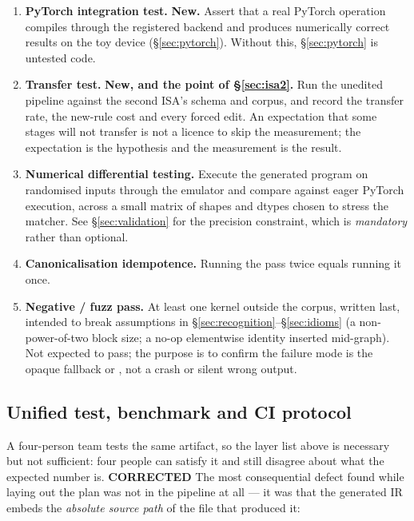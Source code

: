 \documentclass[11pt,a4paper]{article}
\newcommand{\falsified}{\textbf{\textcolor{red!75!black}{CORRECTED}}}
\begin{document}
\begin{enumerate}[leftmargin=1.5em,itemsep=0.35em]
\item \textbf{PyTorch integration test.} \textbf{New.} Assert that a real PyTorch operation compiles through
       the registered backend and produces numerically correct results on the toy device
       (\S\ref{sec:pytorch}). Without this, \S\ref{sec:pytorch} is untested code.

\item \textbf{Transfer test.} \textbf{New, and the point of \S\ref{sec:isa2}.} Run the unedited pipeline
       against the second ISA's schema and corpus, and record the transfer rate, the new-rule cost and every
       forced edit. An expectation that some stages will not transfer is not a licence to skip the
       measurement; the expectation is the hypothesis and the measurement is the result.

\item \textbf{Numerical differential testing.} Execute the generated program on randomised inputs through
       the emulator and compare against eager PyTorch execution, across a small matrix of shapes and dtypes
       chosen to stress the matcher. See \S\ref{sec:validation} for the precision constraint, which is
       \emph{mandatory} rather than optional.

\item \textbf{Canonicalisation idempotence.} Running the pass twice equals running it once.

\item \textbf{Negative / fuzz pass.} At least one kernel outside the corpus, written last, intended to break
       assumptions in \S\ref{sec:recognition}--\S\ref{sec:idioms} (a non-power-of-two block size; a no-op
       elementwise identity inserted mid-graph). Not expected to pass; the purpose is to confirm the failure
       mode is the opaque fallback or , not a crash or silent wrong output.
\end{enumerate}

\subsection{Unified test, benchmark and CI protocol}\label{sec:test-protocol}

A four-person team tests the same artifact, so the layer list above is necessary but not sufficient: four
people can satisfy it and still disagree about what the expected number is. \falsified{} The most consequential
defect found while laying out the plan was not in the pipeline at all --- it was that the generated IR embeds
the \emph{absolute source path} of the file that produced it:
\end{document}
